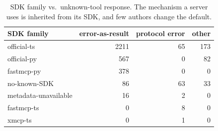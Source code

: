 \begin{table}[t]
\centering
\caption{SDK family vs.\ unknown-tool response. The mechanism a server uses is inherited from its SDK, and few authors change the default.}
\label{tab:sdk}
\begin{tabular}{lrrr}
\toprule
SDK family & error-as-result & protocol error & other \\
\midrule
official-ts & 2211 & 65 & 173 \\
official-py & 567 & 0 & 82 \\
fastmcp-py & 378 & 0 & 0 \\
no-known-SDK & 86 & 63 & 33 \\
metadata-unavailable & 16 & 2 & 0 \\
fastmcp-ts & 0 & 8 & 0 \\
xmcp-ts & 0 & 1 & 0 \\
\bottomrule
\end{tabular}
\end{table}